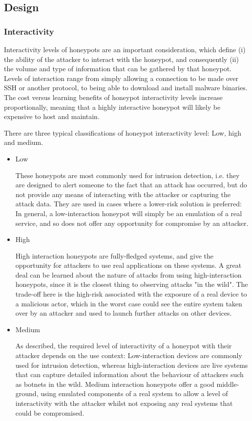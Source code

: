 \subsection{Design}

\subsubsection{Interactivity}

Interactivity levels of honeypots are an important consideration, which define (i) the ability of the attacker to interact with the honeypot, and consequently (ii) the volume and type of information that can be gathered by that honeypot. Levels of interaction range from simply allowing a connection to be made over SSH or another protocol, to being able to download and install malware binaries.  The cost versus learning benefits of honeypot interactivity levels increase proportionally, meaning that a highly interactive honeypot will likely be expensive to host and maintain. 

There are three typical classifications of honeypot interactivity level: Low, high and medium.

\begin{itemize}
	\item Low
	
	These honeypots are most commonly used for intrusion detection, i.e. they are designed to alert someone to the fact that an attack has occurred, but do not provide any means of interacting with the attacker or capturing the attack data. They are used in cases where a lower-risk solution is preferred: In general, a low-interaction honeypot will simply be an emulation of a real service, and so does not offer any opportunity for compromise by an attacker.
	
	\item High
	
	High interaction honeypots are fully-fledged systems, and give the opportunity for attackers to use real applications on these systems. A great deal can be learned about the nature of attacks from using high-interaction honeypots, since it is the closest thing to observing attacks "in the wild". The trade-off here is the high-risk associated with the exposure of a real device to a malicious actor, which in the worst case could see the entire system taken over by an attacker and used to launch further attacks on other devices.
	
	\item Medium
	
	As described, the required level of interactivity of a honeypot with their attacker depends on the use context: Low-interaction devices are commonly used for intrusion detection, whereas high-interaction devices are live systems that can capture detailed information about the behaviour of attackers such as botnets in the wild. Medium interaction honeypots offer a good middle-ground, using emulated components of a real system to allow a level of interactivity with the attacker whilst not exposing any real systems that could be compromised.
	
	
\end{itemize}



